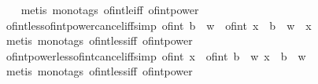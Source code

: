 \begin{isabellebody}
%
\isadelimproof
\ \ %
\endisadelimproof
%
\isatagproof
{}\isamarkupfalse%
\ {\isacharparenleft}{\kern0pt}metis\ {\isacharparenleft}{\kern0pt}mono{\isacharunderscore}{\kern0pt}tags{\isacharparenright}{\kern0pt}\ of{\isacharunderscore}{\kern0pt}int{\isacharunderscore}{\kern0pt}le{\isacharunderscore}{\kern0pt}iff\ of{\isacharunderscore}{\kern0pt}int{\isacharunderscore}{\kern0pt}power{\isacharparenright}{\kern0pt}%
\endisatagproof
{\isafoldproof}%
%
\isadelimproof
\isanewline
%
\endisadelimproof
\isanewline
{}\isamarkupfalse%
\ of{\isacharunderscore}{\kern0pt}int{\isacharunderscore}{\kern0pt}less{\isacharunderscore}{\kern0pt}of{\isacharunderscore}{\kern0pt}int{\isacharunderscore}{\kern0pt}power{\isacharunderscore}{\kern0pt}cancel{\isacharunderscore}{\kern0pt}iff{\isacharbrackleft}{\kern0pt}simp{\isacharbrackright}{\kern0pt}{\isacharcolon}{\kern0pt}\ {\isachardoublequoteopen}{\isacharparenleft}{\kern0pt}of{\isacharunderscore}{\kern0pt}int\ b{\isacharparenright}{\kern0pt}\ {\isacharcircum}{\kern0pt}\ w\ {\isacharless}{\kern0pt}\ of{\isacharunderscore}{\kern0pt}int\ x\ {\isasymlongleftrightarrow}\ b\ {\isacharcircum}{\kern0pt}\ w\ {\isacharless}{\kern0pt}\ x{\isachardoublequoteclose}\isanewline
%
\isadelimproof
\ \ %
\endisadelimproof
%
\isatagproof
{}\isamarkupfalse%
\ {\isacharparenleft}{\kern0pt}metis\ {\isacharparenleft}{\kern0pt}mono{\isacharunderscore}{\kern0pt}tags{\isacharparenright}{\kern0pt}\ of{\isacharunderscore}{\kern0pt}int{\isacharunderscore}{\kern0pt}less{\isacharunderscore}{\kern0pt}iff\ of{\isacharunderscore}{\kern0pt}int{\isacharunderscore}{\kern0pt}power{\isacharparenright}{\kern0pt}%
\endisatagproof
{\isafoldproof}%
%
\isadelimproof
\isanewline
%
\endisadelimproof
\isanewline
{}\isamarkupfalse%
\ of{\isacharunderscore}{\kern0pt}int{\isacharunderscore}{\kern0pt}power{\isacharunderscore}{\kern0pt}less{\isacharunderscore}{\kern0pt}of{\isacharunderscore}{\kern0pt}int{\isacharunderscore}{\kern0pt}cancel{\isacharunderscore}{\kern0pt}iff{\isacharbrackleft}{\kern0pt}simp{\isacharbrackright}{\kern0pt}{\isacharcolon}{\kern0pt}\ {\isachardoublequoteopen}of{\isacharunderscore}{\kern0pt}int\ x\ {\isacharless}{\kern0pt}\ {\isacharparenleft}{\kern0pt}of{\isacharunderscore}{\kern0pt}int\ b{\isacharparenright}{\kern0pt}\ {\isacharcircum}{\kern0pt}\ w{\isasymlongleftrightarrow}\ x\ {\isacharless}{\kern0pt}\ b\ {\isacharcircum}{\kern0pt}\ w{\isachardoublequoteclose}\isanewline
%
\isadelimproof
\ \ %
\endisadelimproof
%
\isatagproof
{}\isamarkupfalse%
\ {\isacharparenleft}{\kern0pt}metis\ {\isacharparenleft}{\kern0pt}mono{\isacharunderscore}{\kern0pt}tags{\isacharparenright}{\kern0pt}\ of{\isacharunderscore}{\kern0pt}int{\isacharunderscore}{\kern0pt}less{\isacharunderscore}{\kern0pt}iff\ of{\isacharunderscore}{\kern0pt}int{\isacharunderscore}{\kern0pt}power{\isacharparenright}{\kern0pt}%

\end{isabellebody}
